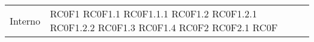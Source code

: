 \begin{center}
\begin{longtable}{|p{5cm}|p{5cm}|}
Interno & RC0F1 \newline RC0F1.1 \newline RC0F1.1.1 \newline RC0F1.2 \newline RC0F1.2.1 \newline RC0F1.2.2 \newline RC0F1.3 \newline RC0F1.4 \newline RC0F2 \newline RC0F2.1 \newline RC0F
\end{longtable}
\end{center}
